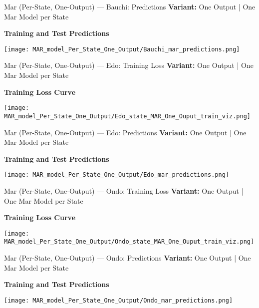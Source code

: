 \documentclass{beamer}
\begin{document}
\begin{frame}{Mar (Per-State, One-Output) — Bauchi: Predictions}
\textbf{Variant:} One Output | One Mar Model per State
\vspace{0.5em}

\textbf{Training and Test Predictions}
\begin{center}
    \texttt{[image: MAR\_model\_Per\_State\_One\_Output/Bauchi\_mar\_predictions.png]}
\end{center}
\end{frame}
%
\begin{frame}{Mar (Per-State, One-Output) — Edo: Training Loss}
\textbf{Variant:} One Output | One Mar Model per State
\vspace{0.5em}

\textbf{Training Loss Curve}
\begin{center}
    \texttt{[image: MAR\_model\_Per\_State\_One\_Output/Edo\_state\_MAR\_One\_Ouput\_train\_viz.png]}
\end{center}
\end{frame}

\begin{frame}{Mar (Per-State, One-Output) — Edo: Predictions}
\textbf{Variant:} One Output | One Mar Model per State
\vspace{0.5em}

\textbf{Training and Test Predictions}
\begin{center}
    \texttt{[image: MAR\_model\_Per\_State\_One\_Output/Edo\_mar\_predictions.png]}
\end{center}
\end{frame}

\begin{frame}{Mar (Per-State, One-Output) — Ondo: Training Loss}
\textbf{Variant:} One Output | One Mar Model per State
\vspace{0.5em}

\textbf{Training Loss Curve}
\begin{center}
    \texttt{[image: MAR\_model\_Per\_State\_One\_Output/Ondo\_state\_MAR\_One\_Ouput\_train\_viz.png]}
\end{center}
\end{frame}

\begin{frame}{Mar (Per-State, One-Output) — Ondo: Predictions}
\textbf{Variant:} One Output | One Mar Model per State
\vspace{0.5em}

\textbf{Training and Test Predictions}
\begin{center}
    \texttt{[image: MAR\_model\_Per\_State\_One\_Output/Ondo\_mar\_predictions.png]}
\end{center}
\end{frame}
\end{document}
